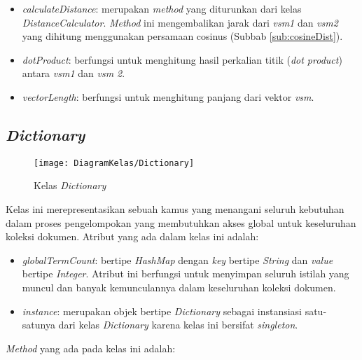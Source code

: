 \begin{itemize}
	\item \textit{calculateDistance}: merupakan \textit{method} yang diturunkan dari kelas \textit{DistanceCalculator}. \textit{Method} ini mengembalikan jarak dari \textit{vsm1} dan \textit{vsm2} yang dihitung menggunakan persamaan cosinus (Subbab \ref{sub:cosineDist}).
	\item \textit{dotProduct}: berfungsi untuk menghitung hasil perkalian titik (\textit{dot product}) antara \textit{vsm1} dan \textit{vsm 2}.
	\item \textit{vectorLength}: berfungsi untuk menghitung panjang dari vektor \textit{vsm}.
\end{itemize}

\subsection{\textit{Dictionary}}

\begin{figure}[h]
	\begin{center}
		\texttt{[image: DiagramKelas/Dictionary]}
		\caption{Kelas \textit{Dictionary}}
		\label{fig:kelasDictionary}
	\end{center}
\end{figure}

Kelas ini merepresentasikan sebuah kamus yang menangani seluruh kebutuhan dalam proses pengelompokan yang membutuhkan akses global untuk keseluruhan koleksi dokumen. Atribut yang ada dalam kelas ini adalah:

\begin{itemize}
	\item \textit{globalTermCount}: bertipe \textit{HashMap} dengan \textit{key} bertipe \textit{String} dan \textit{value} bertipe \textit{Integer}. Atribut ini berfungsi untuk menyimpan seluruh istilah yang muncul dan banyak kemunculannya dalam keseluruhan koleksi dokumen.
	\item \textit{instance}: merupakan objek bertipe \textit{Dictionary} sebagai instansiasi satu-satunya dari kelas \textit{Dictionary} karena kelas ini bersifat \textit{singleton}.
\end{itemize}

\textit{Method} yang ada pada kelas ini adalah:

